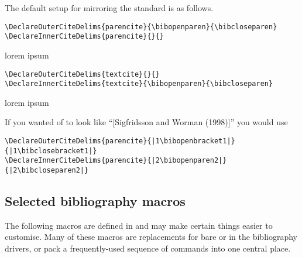 \documentclass[DIV=9]{scrartcl}
\newcommand*{\highlightbf}[2][1]{\textcolor{highlight#1}{\textbf{#2}}}
\begin{document}
\begin{ltxsyntax}
The default setup for  mirroring
the standard  is as follows.
%
\begin{bibexample}[title={\cmd{parencite} setup of
  \blxstyle{ext-authoryear}}]
\begin{lstlisting}[style=extblxstylelatex]
\DeclareOuterCiteDelims{parencite}{\bibopenparen}{\bibcloseparen}
\DeclareInnerCiteDelims{parencite}{}{}
\end{lstlisting}
\tcblower
lorem \parencite{knuth:ct:a} ipsum \parencite{sigfridsson}
\end{bibexample}
%
\begin{bibexample}[title={\cmd{textcite} setup of
  \blxstyle{ext-authoryear}}]
\begin{lstlisting}[style=extblxstylelatex]
\DeclareOuterCiteDelims{textcite}{}{}
\DeclareInnerCiteDelims{textcite}{\bibopenparen}{\bibcloseparen}
\end{lstlisting}
\tcblower
lorem \textcite{knuth:ct:a} ipsum \textcite{sigfridsson}
\end{bibexample}
%
If you wanted  of 
to look like \enquote{[Sigfridsson and Worman (1998)]} you would use
\citereset
\begin{bibexample}
\begin{lstlisting}[style=extblxstylelatex]
\DeclareOuterCiteDelims{parencite}{|1\bibopenbracket1|}{|1\bibclosebracket1|}
\DeclareInnerCiteDelims{parencite}{|2\bibopenparen2|}{|2\bibcloseparen2|}
\end{lstlisting}
\tcblower
\DeclareOuterCiteDelims{parencite}{\highlightbf[1]{\bibopenbracket}}{%
  \highlightbf[1]{\bibclosebracket}}
\DeclareInnerCiteDelims{parencite}{\highlightbf[2]{\bibopenparen}}{%
  \highlightbf[2]{\bibcloseparen}}
\parencite{sigfridsson}\quad\parencite{worman,geer}\quad
\parencite{knuth:ct:a,knuth:ct:b,knuth:ct:c}
\end{bibexample}
\end{ltxsyntax}

\subsection{Selected bibliography macros}\label{sec:opt:bibmacros}
The following macros are defined in  and may make
certain things easier to customise.
Many of these macros are replacements for bare  or
 in the bibliography drivers, or pack a frequently-used
sequence of commands into one central place.
\end{document}
